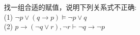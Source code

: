 找一组合适的赋值，说明下列关系式不正确: \\
(1) $\neg p\vee (q\rightarrow p) \models \neg p \vee q$\\
(2) $p\rightarrow(\neg q \vee r),\neg r\vdash \neg q\rightarrow \neg p$